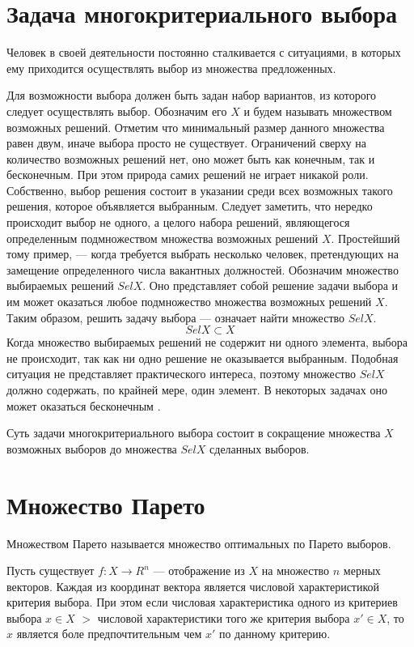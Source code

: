 \documentclass[a4paper,14pt]{report}
\begin{document}
\section{Задача многокритериального выбора}
 Человек в своей
деятельности постоянно сталкивается с ситуациями, в которых ему приходится осуществлять
выбор из множества предложенных. 

Для возможности выбора должен быть задан набор вариантов, из которого следует
осуществлять выбор. Обозначим его $X$ и будем называть множеством возможных решений. 
Отметим что минимальный размер данного множества равен двум, иначе выбора просто не существует. Ограничений сверху на количество возможных решений нет, оно может быть
как конечным, так и бесконечным. При этом природа самих решений не играет никакой роли.
Собственно, выбор решения состоит в указании среди всех возможных такого решения, которое объявляется выбранным. Следует заметить, что нередко происходит выбор не
одного, а целого набора решений, являющегося определенным подмножеством множества
возможных решений $X$. Простейший тому пример, --- когда требуется выбрать несколько человек, претендующих на замещение определенного числа вакантных должностей.
Обозначим множество выбираемых решений $Sel X$. Оно представляет собой решение задачи выбора и им может оказаться любое подмножество множества возможных решений $X$. Таким образом, решить задачу выбора --- означает найти множество $Sel X$.
\begin{equation}
Sel X \subset X
\label{ref:this}
\end{equation}
 Когда множество выбираемых решений не содержит ни одного элемента, выбора не происходит, так как ни одно решение не оказывается выбранным. Подобная ситуация не представляет практического интереса, поэтому множество $Sel X$ должно содержать, по крайней мере, один элемент. В некоторых задачах оно может оказаться бесконечным \cite{formul}.

Суть задачи многокритериального выбора состоит в сокращение множества $X$ возможных выборов до множества $Sel X$ сделанных выборов.

\section{Множество Парето} 
Множеством Парето называется множество оптимальных по Парето выборов.

Пусть существует $f:X \rightarrow R^n$ --- отображение из $X$ на множество $n$ мерных векторов. Каждая из координат вектора является числовой характеристикой критерия выбора. При этом если числовая характеристика одного из критериев выбора $x \in X$ $>$ числовой характеристики того же критерия выбора $x' \in X$, то $x$ является боле предпочтительным чем $x'$ по данному критерию.
 
\end{document}
